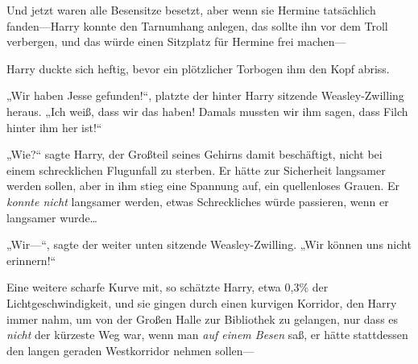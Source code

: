 Und jetzt waren alle Besensitze besetzt, aber wenn sie Hermine tatsächlich fanden—Harry konnte den Tarnumhang anlegen, das sollte ihn vor dem Troll verbergen, und das würde einen Sitzplatz für Hermine frei machen—

Harry duckte sich heftig, bevor ein plötzlicher Torbogen ihm den Kopf abriss.

„Wir haben Jesse gefunden!“, platzte der hinter Harry sitzende Weasley-Zwilling heraus.
„Ich weiß, dass wir das haben! Damals mussten wir ihm sagen, dass Filch hinter ihm her ist!“

„Wie?“ sagte Harry, der Großteil seines Gehirns damit beschäftigt, nicht bei einem schrecklichen Flugunfall zu sterben. Er hätte zur Sicherheit langsamer werden sollen, aber in ihm stieg eine Spannung auf, ein quellenloses Grauen. Er \emph{konnte nicht} langsamer werden, etwas Schreckliches würde passieren, wenn er langsamer wurde…

„Wir—“, sagte der weiter unten sitzende Weasley-Zwilling.
„Wir können uns nicht erinnern!“

Eine weitere scharfe Kurve mit, so schätzte Harry, etwa 0,3\% der Lichtgeschwindigkeit, und sie gingen durch einen kurvigen Korridor, den Harry immer nahm, um von der Großen Halle zur Bibliothek zu gelangen, nur dass es \emph{nicht} der kürzeste Weg war, wenn man \emph{auf einem Besen} saß, er hätte stattdessen den langen geraden Westkorridor nehmen sollen—

